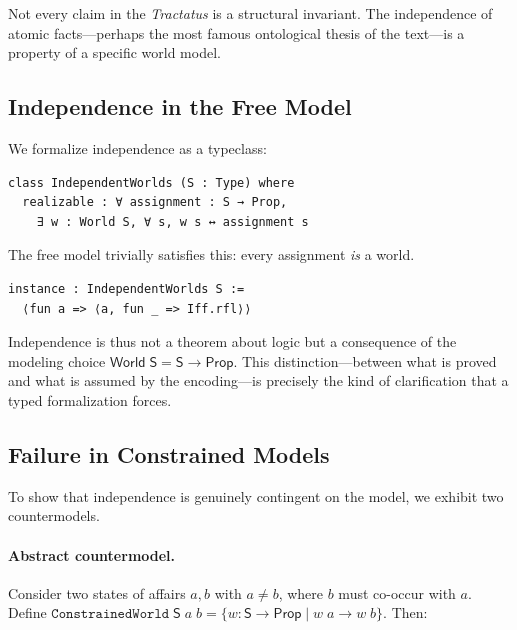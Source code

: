 \documentclass[jsl,bibother]{asl}
\theoremstyle{definition}
\theoremstyle{remark}
\newcommand{\Sach}{\mathsf{S}}
\newcommand{\World}{\mathsf{World}}
\newcommand{\Prop}{\mathsf{Prop}}
\begin{document}
Not every claim in the \emph{Tractatus} is a structural
invariant.  The independence of atomic facts---perhaps the most
famous ontological thesis of the text---is a property of a
specific world model.

\subsection{Independence in the Free Model}
\label{sec:independence}

We formalize independence as a typeclass:

\begin{lstlisting}
class IndependentWorlds (S : Type) where
  realizable : ∀ assignment : S → Prop,
    ∃ w : World S, ∀ s, w s ↔ assignment s
\end{lstlisting}

\noindent
The free model trivially satisfies this: every assignment
\emph{is} a world.

\begin{lstlisting}
instance : IndependentWorlds S :=
  ⟨fun a => ⟨a, fun _ => Iff.rfl⟩⟩
\end{lstlisting}

\noindent
Independence is thus not a theorem about logic but a consequence
of the modeling choice $\World\;\Sach = \Sach \to \Prop$.
This distinction---between what is proved and what is assumed by
the encoding---is precisely the kind of clarification that a
typed formalization forces.

\subsection{Failure in Constrained Models}
\label{sec:constrained}

To show that independence is genuinely contingent on the model,
we exhibit two countermodels.

\paragraph{Abstract countermodel.}
Consider two states of affairs $a, b$ with $a \neq b$, where
$b$ must co-occur with $a$.  Define
$\mathtt{ConstrainedWorld}\;\Sach\;a\;b = \{w : \Sach \to \Prop
\mid w\;a \to w\;b\}$.  Then:
\end{document}
